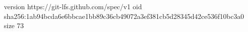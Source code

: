 version https://git-lfs.github.com/spec/v1
oid sha256:1ab94bcda6e6bbcae1bb89c36cb49072a3ef381cb5d28345d42ce536f10bc3a0
size 73
